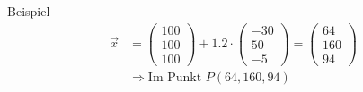 \documentclass{article}
\begin{document}
\begin{boxx}[DarkBlue]{Beispiel}
\begin{align*}
                \vec{x} &= \begin{pmatrix}100\\100\\100\end{pmatrix} + 1.2 \cdot \begin{pmatrix}-30\\50\\-5\end{pmatrix} = \begin{pmatrix}64\\160\\94\end{pmatrix} \\
                &\Rightarrow \text{Im Punkt } P(64,160,94)
            \end{align*}
    \end{boxx}
\end{document}
